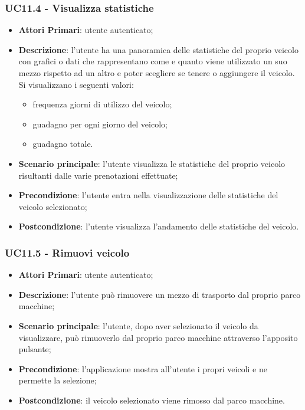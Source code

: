 \subsubsection{UC11.4 - Visualizza statistiche}
\begin{itemize}
	\item \textbf{Attori Primari}: utente autenticato;
	\item \textbf{Descrizione}: l'utente ha una panoramica delle statistiche del proprio veicolo con grafici o dati che rappresentano come e quanto viene utilizzato un suo mezzo rispetto ad un altro e poter scegliere se tenere o aggiungere il veicolo. Si visualizzano i seguenti valori:
	\begin{itemize}
		\item frequenza giorni di utilizzo del veicolo;
		\item guadagno per ogni giorno del veicolo;
		\item guadagno totale.
	\end{itemize}
	\item \textbf{Scenario principale}: l'utente visualizza le statistiche del proprio veicolo risultanti dalle varie prenotazioni effettuate;
	\item \textbf{Precondizione}: l'utente entra nella visualizzazione delle statistiche del veicolo selezionato;
	\item \textbf{Postcondizione}: l'utente visualizza l'andamento delle statistiche del veicolo. 
\end{itemize}
\subsubsection{UC11.5 - Rimuovi veicolo}
\begin{itemize}
	\item \textbf{Attori Primari}: utente autenticato;
	\item \textbf{Descrizione}: l'utente può rimuovere un mezzo di trasporto dal proprio parco macchine;
	\item \textbf{Scenario principale}: l'utente, dopo aver selezionato il veicolo da visualizzare, può rimuoverlo dal proprio parco macchine attraverso l'apposito pulsante;
	\item \textbf{Precondizione}: l'applicazione mostra all'utente i propri veicoli e ne permette la selezione;
	\item \textbf{Postcondizione}: il veicolo selezionato viene rimosso dal parco macchine.
\end{itemize}